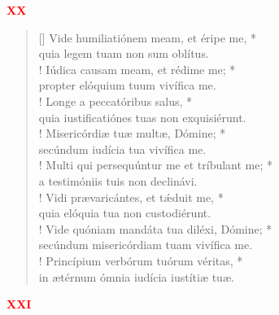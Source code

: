 


\def\greinitialformat#1{%
{\fontsize{39}{39}\selectfont #1}%
}




\vspace{0.3cm}
\begin{center}
 \textcolor{red}{\bf XX}
\end{center}
\begin{verse}[\versewidth]
Vide humiliatiónem meam, et éripe me, *\\
quia legem tuam non sum oblítus.\\!
\vin Iúdica causam meam, et rédime me; *\\
\vin propter elóquium tuum vivífica me.\\!
Longe a peccatóribus salus, *\\
quia iustificatiónes tuas non exquisiérunt.\\!
\vin Misericórdiæ tuæ multæ, Dómine; *\\
\vin secúndum iudícia tua vivífica me.\\!
Multi qui persequúntur me et tríbulant me; *\\
a testimóniis tuis non declinávi.\\!
\vin Vidi prævaricántes, et t\'{æ}duit me, *\\
\vin quia elóquia tua non custodiérunt.\\!
Vide quóniam mandáta tua diléxi, Dómine; *\\
secúndum misericórdiam tuam vivífica me.\\!
\vin Princípium verbórum tuórum véritas, *\\
\vin in ætérnum ómnia iudícia iustítiæ tuæ.\\
\end{verse}
\begin{center}
\textcolor{red}{\bf XXI}\\
\end{center}
